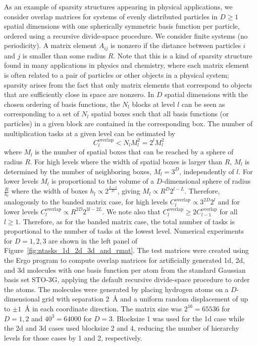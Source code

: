 \documentclass{elsarticle}
\begin{document}
As an example of sparsity structures appearing in physical
applications, we consider overlap matrices for systems of evenly
distributed particles in $D \geq 1$ spatial dimensions with one
spherically symmetric basis function per particle, ordered using a
recursive divide-space procedure. We consider finite systems (no
periodicity). A
matrix element $A_{ij}$ is nonzero if the distance between particles
 $i$ and $j$ is smaller than some radius $R$. Note that this
is a kind of sparsity structure found in many applications in physics
and chemistry, where each matrix element is often related to a pair of
particles or other objects in a physical system; sparsity arises from
the fact that only matrix elements that correspond to objects that are
sufficiently close in space are nonzero.
In $D$ spatial dimensions with the chosen ordering of basis functions,
the $N_l$ blocks at level $l$ can be seen as corresponding to a set of
$N_l$ spatial boxes such that all basis functions (or particles) in a
given block are contained in the corresponding box. The number of
multiplication tasks at a given level can be estimated by
\begin{equation}\label{eq:no_of_mmul_tasks_at_level_overlap}
C_l^{\mathrm{overlap}} < N_l M_l^2 = 2^l M_l^2
\end{equation}
where $M_l$ is the number of spatial boxes that can be reached by a
sphere of radius $R$. For high levels where the width of spatial boxes
is larger than $R$, $M_l$ is determined by the number of neighboring
boxes, $M_l = 3^D$, independently of $l$. For lower levels $M_l$ is
proportional to the volume of a $D$-dimensional sphere of radius
$\frac{R}{h_l}$ where the width of boxes $h_l \propto
2^{\frac{L-l}{D}}$, giving $M_l \propto R^D 2^{l-L}$. Therefore,
analogously to the banded matrix case, for high levels
$C_l^{\mathrm{overlap}} \propto 3^{2D} 2^l$ and for lower levels
$C_l^{\mathrm{overlap}} \propto R^{2D} 2^{3l-2L}$.
We note also that $C_l^{\mathrm{overlap}} \geq 2
C_{l-1}^{\mathrm{overlap}}$ for all $l \geq 1$.
Therefore, as for the banded matrix
case, the total number of tasks is proportional to the number of tasks
at the lowest level.
Numerical experiments for $D = 1, 2, 3$ are shown in the left panel of
Figure~\ref{fig:ntasks_1d_2d_3d_and_rmat}.
The test matrices were created using the {\sc Ergo} program \cite{linmemDFT} to compute
overlap matrices for artificially generated 1d, 2d, and 3d molecules
with one basis function per atom from the standard Gaussian basis set STO-3G, applying the default
recursive divide-space procedure to order the atoms. The molecules
were generated by placing hydrogen atoms on a $D$-dimensional grid with
separation 2~{\AA} and a uniform random displacement of up to $\pm 1$~{\AA} in each coordinate direction. The matrix size
was $2^{16} = 65536$ for $D = 1, 2$ and $40^3 = 64000$ for $D =
3$. Blocksize 1 was used for the 1d case while the 2d and 3d cases
used blocksize 2 and 4, reducing the number of hierarchy levels for those
cases by 1 and 2, respectively.
\end{document}
